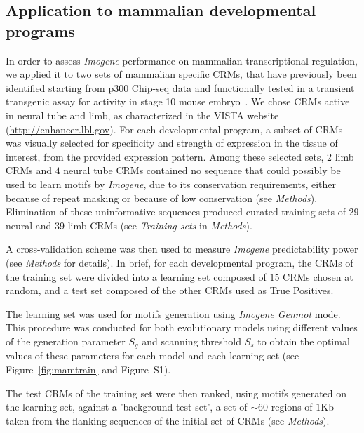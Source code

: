 \documentclass[a4,center,fleqn]{NAR}
\begin{document}
\subsection*{Application to mammalian developmental programs}

In order to assess {\em Imogene} performance on mammalian transcriptional
regulation, we applied it to two sets of mammalian specific CRMs,  that have
previously been identified starting from p300 Chip-seq data and functionally
tested in a transient transgenic assay for activity in stage 10 mouse
embryo~\cite{Visel:2009fr,pmid22138689}.
We chose CRMs active in neural tube and limb, as characterized in the VISTA
website (\url{http://enhancer.lbl.gov}).
For each developmental program, a subset of CRMs was visually selected for
specificity and strength of expression in the tissue of interest, from the
provided expression pattern.
Among these selected sets, $2$ limb CRMs and $4$ neural tube CRMs contained no
sequence that could possibly be used to learn motifs by {\em Imogene}, due to
its conservation requirements, either because of repeat masking or because of
low conservation (see {\em Methods}).
Elimination of these uninformative sequences produced curated training sets of
29 neural and 39 limb CRMs (see {\em Training sets} in {\em Methods}).

A cross-validation scheme was then used to measure {\em Imogene} predictability
power (see {\em Methods} for details).
In brief, for each developmental program, the CRMs of the training set were
divided into a learning set composed of $15$ CRMs chosen at random, and a test
set composed of the other CRMs used as True Positives.


The learning set was used for motifs generation using {\em Imogene Genmot} mode.
This procedure was conducted for both evolutionary models using different
values of the generation parameter $S_g$ and scanning threshold $S_s$ to obtain
the optimal values of these parameters for each model  and each learning
set (see Figure~\ref{fig:mamtrain} and Figure~S1).

The test CRMs of the training set were then ranked, using  motifs generated on
the learning set, against a 'background test set', a set of $\sim60$ regions of
$1$Kb taken from the flanking sequences of the initial set of CRMs (see {\em
Methods}).
\end{document}
